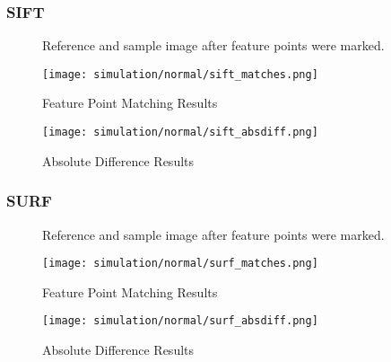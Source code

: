 		\subsubsection{SIFT}
		\begin{figure}[H]
			\caption{Reference and sample image after feature points were marked.}
			\label{fig:siftFeaturePoints}
		\end{figure}
		\begin{figure}[H]
			\texttt{[image: simulation/normal/sift\_matches.png]}
			\caption{Feature Point Matching Results}
			\label{fig:sifeMatchingResult}
		\end{figure}
		\begin{figure}[H]
			\texttt{[image: simulation/normal/sift\_absdiff.png]}
			\caption{Absolute Difference Results}
			\label{fig:siftAbsDifference}
		\end{figure}


		\subsubsection{SURF}
		\begin{figure}[H]
			\caption{Reference and sample image after feature points were marked.}
			\label{fig:siftFeaturePoints}
		\end{figure}
		\begin{figure}[H]
			\texttt{[image: simulation/normal/surf\_matches.png]}
			\caption{Feature Point Matching Results}
			\label{fig:sifeMatchingResult}
		\end{figure}
		\begin{figure}[H]
			\texttt{[image: simulation/normal/surf\_absdiff.png]}
			\caption{Absolute Difference Results}
			\label{fig:siftAbsDifference}
		\end{figure}


